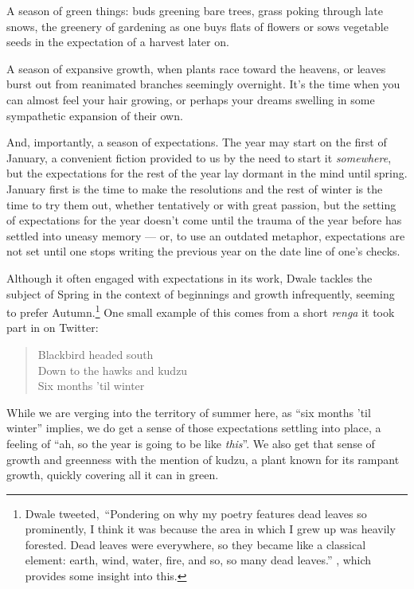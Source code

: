 \documentclass[12pt]{memoir}
\begin{document}
A season of green things: buds greening bare trees, grass poking through late snows, the greenery of gardening as one buys flats of flowers or sows vegetable seeds in the expectation of a harvest later on.

A season of expansive growth, when plants race toward the heavens, or leaves burst out from reanimated branches seemingly overnight. It's the time when you can almost feel your hair growing, or perhaps your dreams swelling in some sympathetic expansion of their own.

And, importantly, a season of expectations. The year may start on the first of January, a convenient fiction provided to us by the need to start it \emph{somewhere}, but the expectations for the rest of the year lay dormant in the mind until spring. January first is the time to make the resolutions and the rest of winter is the time to try them out, whether tentatively or with great passion, but the setting of expectations for the year doesn't come until the trauma of the year before has settled into uneasy memory --- or, to use an outdated metaphor, expectations are not set until one stops writing the previous year on the date line of one's checks.

Although it often engaged with expectations in its work, Dwale tackles the subject of Spring in the context of beginnings and growth infrequently, seeming to prefer Autumn.\footnote{Dwale tweeted,\footnotemark~``Pondering on why my poetry features dead leaves so prominently, I think it was because the area in which I grew up was heavily forested. Dead leaves were everywhere, so they became like a classical element: earth, wind, water, fire, and so, so many dead leaves.'' \parencite{dwale_leaves_tweet}, which provides some insight into this.} One small example of this comes from a short \emph{renga} it took part in on Twitter:

\begin{verse}
Blackbird headed south\\
Down to the hawks and kudzu\\
Six months 'til winter

\parencite{dwale_haiku}
\end{verse}

While we are verging into the territory of summer here, as ``six months 'til winter'' implies, we do get a sense of those expectations settling into place, a feeling of ``ah, so the year is going to be like \emph{this}''. We also get that sense of growth and greenness with the mention of kudzu, a plant known for its rampant growth, quickly covering all it can in green.
\end{document}
